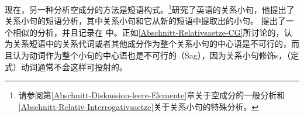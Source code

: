 %
现在，另一种分析空成分的方法是短语构式。\footnote{%
请参阅第\ref{Abschnitt-Diskussion-leere-Elemente}章关于空成分的一般分析和\ref{Abschnitt-Relativ-Interrogativsaetze}关于关系小句的特殊分析。
}\cite{Sag97a}研究了英语的关系小句，他提出了关系小句的短语分析，其中关系小句和它从新的短语中提取出的小句。 \citet{Babel}提出了一个相似的分析，并且记录在 中。正如\ref{Abschnitt-Relativsaetze-CG}所讨论的，认为关系短语中的关系代词或者其他成分作为整个关系小句的中心语是不可行的，而且认为动词作为整个小句的中心语也是不可行的（Sag），因为关系小句修饰\nbar{}s，（定式）动词通常不会这样可投射的。
